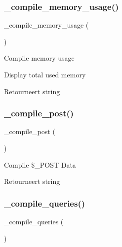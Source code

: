 \subsubsection{\texorpdfstring{\_compile\_memory\_usage()}{\_compile\_memory\_usage()}}
{\footnotesize\ttfamily \+\_\+compile\+\_\+memory\+\_\+usage (\begin{DoxyParamCaption}{ }\end{DoxyParamCaption})\hspace{0.3cm}{\ttfamily [protected]}}

Compile memory usage

Display total used memory

\begin{DoxyReturn}{Retourneert}
string 
\end{DoxyReturn}
\mbox{\label{class_c_i___profiler_a42ae55500668793b1cec3d79b6ea9209}} 
\subsubsection{\texorpdfstring{\_compile\_post()}{\_compile\_post()}}
{\footnotesize\ttfamily \+\_\+compile\+\_\+post (\begin{DoxyParamCaption}{ }\end{DoxyParamCaption})\hspace{0.3cm}{\ttfamily [protected]}}

Compile \$\+\_\+\+P\+O\+ST Data

\begin{DoxyReturn}{Retourneert}
string 
\end{DoxyReturn}
\mbox{\label{class_c_i___profiler_a5d16e69fed0307c51b9479ebbb2049b6}} 
\subsubsection{\texorpdfstring{\_compile\_queries()}{\_compile\_queries()}}
{\footnotesize\ttfamily \+\_\+compile\+\_\+queries (\begin{DoxyParamCaption}{ }\end{DoxyParamCaption})\hspace{0.3cm}{\ttfamily [protected]}}

